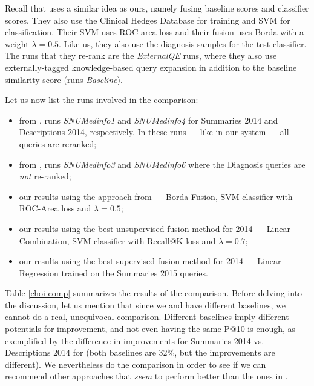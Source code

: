 Recall that \cite{choi} uses a similar idea as ours, namely fusing baseline scores and
classifier scores. They also use the Clinical Hedges Database for training and SVM for classification.
Their SVM uses ROC-area loss and their fusion uses Borda with a weight $\lambda=0.5$.
Like us, they also use the diagnosis samples for the test classifier.
The runs that they re-rank are the \emph{ExternalQE} runs, where
they also use externally-tagged knowledge-based query expansion in addition to the baseline similarity score
(runs \emph{Baseline}).

Let us now list the runs involved in the comparison:
\begin{itemize}
 \item from \cite{choi}, runs \emph{SNUMedinfo1} and \emph{SNUMedinfo4} for Summaries 2014 and Descriptions 2014, respectively.
  In these runs --- like in our system --- all queries are reranked;
 \item from \cite{choi}, runs \emph{SNUMedinfo3} and \emph{SNUMedinfo6} where the Diagnosis queries are \emph{not} re-ranked;
 \item our results using the approach from \cite{choi} --- Borda Fusion, SVM classifier with ROC-Area loss and $\lambda=0.5$;
 \item our results using the best unsupervised fusion method for 2014 --- Linear Combination, SVM classifier with Recall@K loss and $\lambda=0.7$;
 \item our results using the best supervised fusion method for 2014 --- Linear Regression trained on the Summaries 2015 queries.
\end{itemize}

Table \ref{choi-comp} summarizes the results of the comparison.
Before delving into the discussion, let us mention that since we and \cite{choi} have different baselines,
we cannot do a real, unequivocal comparison. Different baselines imply different potentials for improvement, and
not even having the same P@10 is enough, as exemplified by the difference in improvements for Summaries
2014 vs. Descriptions 2014 for \cite{choi} (both baselines are 32\%, but the improvements are different).
We nevertheless do the comparison in order to see if we can recommend other approaches that \emph{seem}
to perform better than the ones in \cite{choi}.

